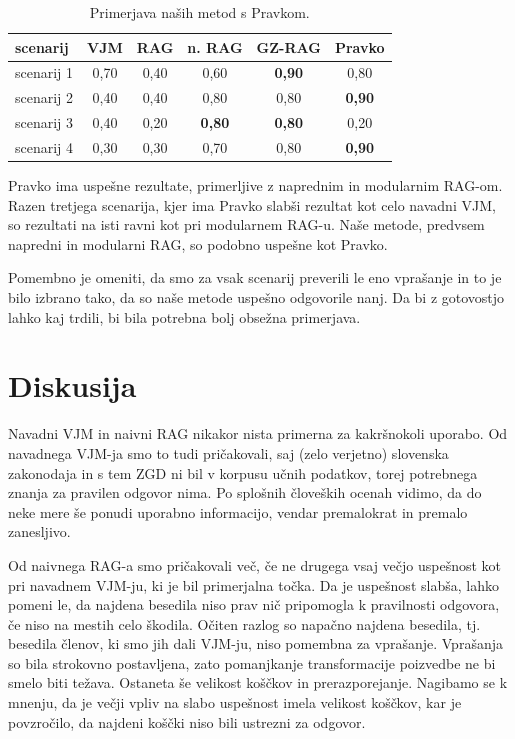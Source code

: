 \documentclass[a4paper,12pt,openright]{book}
\begin{document}
\begin{table}[H]
	\centering
	\caption{Primerjava naših metod s Pravkom.}
	\begin{tabular}{|l|c|c|c|c|c|}
		\hline
		scenarij   & VJM  & RAG  & n. RAG        & GZ-RAG        & Pravko        \\ \hline
		scenarij 1 & 0,70 & 0,40 & 0,60          & \textbf{0,90} & 0,80          \\ \hline
		scenarij 2 & 0,40 & 0,40 & 0,80          & 0,80          & \textbf{0,90} \\ \hline
		scenarij 3 & 0,40 & 0,20 & \textbf{0,80} & \textbf{0,80} & 0,20          \\ \hline
		scenarij 4 & 0,30 & 0,30 & 0,70          & 0,80          & \textbf{0,90} \\ \hline
	\end{tabular}
\end{table}

Pravko ima uspešne rezultate, primerljive z naprednim in modularnim RAG-om. Razen tretjega scenarija, kjer ima Pravko slabši rezultat kot celo navadni VJM, so rezultati na isti ravni kot pri modularnem RAG-u. Naše metode, predvsem napredni in modularni RAG, so podobno uspešne kot Pravko.

Pomembno je omeniti, da smo za vsak scenarij preverili le eno vprašanje in to je bilo izbrano tako, da so naše metode uspešno odgovorile nanj. Da bi z gotovostjo lahko kaj trdili, bi bila potrebna bolj obsežna primerjava.

\section{Diskusija}

Navadni VJM in naivni RAG nikakor nista primerna za kakršnokoli uporabo. Od navadnega VJM-ja smo to tudi pričakovali, saj (zelo verjetno) slovenska zakonodaja in s tem ZGD ni bil v korpusu učnih podatkov, torej potrebnega znanja za pravilen odgovor nima. Po splošnih človeških ocenah vidimo, da do neke mere še ponudi uporabno informacijo, vendar premalokrat in premalo zanesljivo.

Od naivnega RAG-a smo pričakovali več, če ne drugega vsaj večjo uspešnost kot pri navadnem VJM-ju, ki je bil primerjalna točka. Da je uspešnost slabša, lahko pomeni le, da najdena besedila niso prav nič pripomogla k pravilnosti odgovora, če niso na mestih celo škodila. Očiten razlog so napačno najdena besedila, tj. besedila členov, ki smo jih dali VJM-ju, niso pomembna za vprašanje. Vprašanja so bila strokovno postavljena, zato pomanjkanje transformacije poizvedbe ne bi smelo biti težava. Ostaneta še velikost koščkov in prerazporejanje. Nagibamo se k mnenju, da je večji vpliv na slabo uspešnost imela velikost koščkov, kar je povzročilo, da najdeni koščki niso bili ustrezni za odgovor.
\end{document}
